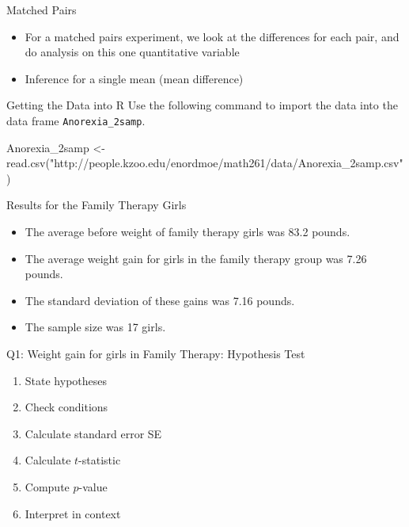 \documentclass[
  ignorenonframetext,
  aspectratio=32,
]{beamer}
\newenvironment{Shaded}{\begin{snugshade}}{\end{snugshade}}
\newcommand{\FunctionTok}[1]{\textcolor[rgb]{0.28,0.35,0.67}{#1}}
\newcommand{\NormalTok}[1]{\textcolor[rgb]{0.00,0.23,0.31}{#1}}
\newcommand{\OtherTok}[1]{\textcolor[rgb]{0.00,0.23,0.31}{#1}}
\newcommand{\StringTok}[1]{\textcolor[rgb]{0.13,0.47,0.30}{#1}}
\begin{document}
\begin{frame}{Matched Pairs}
\protect\hypertarget{matched-pairs}{}
\begin{itemize}
\item
  For a matched pairs experiment, we look at the differences for each
  pair, and do analysis on this one quantitative variable
\item
  Inference for a single mean (mean difference)
\end{itemize}
\end{frame}

\begin{frame}[fragile]{Getting the Data into R}
\protect\hypertarget{getting-the-data-into-r}{}
Use the following command to import the data into the data frame
\texttt{Anorexia\_2samp}.

\begin{Shaded}
\begin{Highlighting}[]
\NormalTok{Anorexia\_2samp }\OtherTok{\textless{}{-}}
  \FunctionTok{read.csv}\NormalTok{(}\StringTok{"http://people.kzoo.edu/enordmoe/math261/data/Anorexia\_2samp.csv"}\NormalTok{)}
\end{Highlighting}
\end{Shaded}
\end{frame}

\begin{frame}{Results for the Family Therapy Girls}
\protect\hypertarget{results-for-the-family-therapy-girls}{}
\begin{itemize}
\item
  The average before weight of family therapy girls was 83.2 pounds.
\item
  The average weight gain for girls in the family therapy group was 7.26
  pounds.
\item
  The standard deviation of these gains was 7.16 pounds.
\item
  The sample size was 17 girls.
\end{itemize}
\end{frame}

\begin{frame}{Q1: Weight gain for girls in Family Therapy: Hypothesis
Test}
\protect\hypertarget{q1-weight-gain-for-girls-in-family-therapy-hypothesis-test}{}
\begin{enumerate}
\item
  State hypotheses
\item
  Check conditions
\item
  Calculate standard error SE
\item
  Calculate \(t\)-statistic
\item
  Compute \(p\)-value
\item
  Interpret in context
\end{enumerate}
\end{frame}
\end{document}

